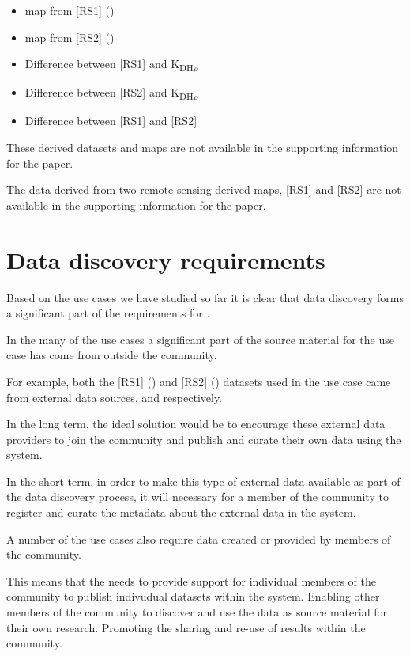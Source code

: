 \documentclass{article}
\begin{document}
\begin{itemize}
\item \cite{term-agb} map from [RS1] (\cite{saatchi-2011})
\item \cite{term-agb} map from [RS2] (\cite{baccini-2012})
\item Difference between [RS1] and K\textsubscript{DH$\rho$}
\item Difference between [RS2] and K\textsubscript{DH$\rho$}
\item Difference between [RS1] and [RS2]
\end{itemize}

These derived datasets and maps are not available in the supporting information for the paper.

The \cite{term-agb} data derived from two remote-sensing-derived maps,
\cite{saatchi-2011} [RS1] and \cite{baccini-2012} [RS2]
are not available in the supporting information for the paper.

\section{Data discovery requirements}

Based on the \cite{trop} use cases we have studied so far it is clear that data discovery
forms a significant part of the requirements for \cite{trop}.

In the many of the use cases a significant part of the source material for the use case has come
from outside the \cite{trop} community.

For example, both the [RS1] (\cite{saatchi-2011}) and [RS2] (\cite{baccini-2012}) datasets used in
the \cite{mitchard-2014} use case came from external data sources, 
and  respectively.

In the long term, the ideal solution would be to encourage these external data providers to join
the \cite{trop} community and publish and curate their own data using the \cite{trop}
system.

In the short term, in order to make this type of external data available as part of the \cite{trop}
data discovery process, it will necessary for a member of the \cite{trop} community to register
and curate the metadata about the external data in the \cite{trop} system.

A number of the \cite{trop} use cases also require data created or provided by members of the
\cite{trop} community.

This means that the \cite{trop} needs to provide support for individual members of the
\cite{trop} community to publish indivudual datasets within the \cite{trop} system.
Enabling other members of the \cite{trop} community to discover and use the data as
source material for their own research.
Promoting the sharing and re-use of results within the \cite{trop} community.
\end{document}
